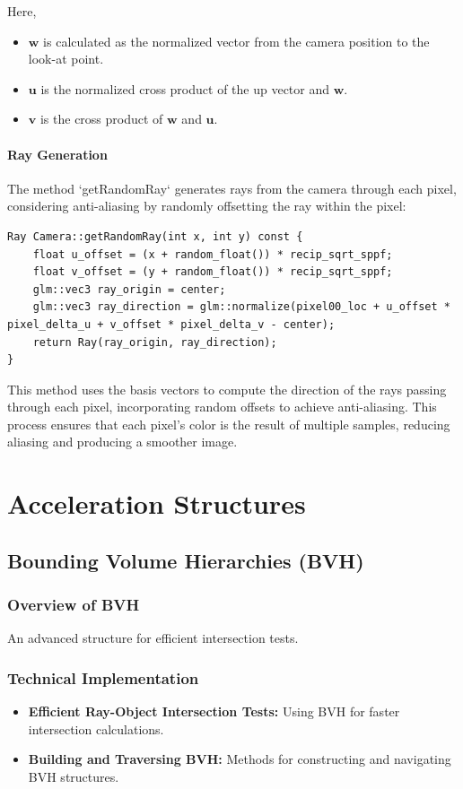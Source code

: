 \documentclass[12pt]{article}
\begin{document}
Here,
\begin{itemize}
    \item \(\mathbf{w}\) is calculated as the normalized vector from the camera position to the look-at point.
    \item \(\mathbf{u}\) is the normalized cross product of the up vector and \(\mathbf{w}\).
    \item \(\mathbf{v}\) is the cross product of \(\mathbf{w}\) and \(\mathbf{u}\).
\end{itemize}

\paragraph{Ray Generation}
The method `getRandomRay` generates rays from the camera through each pixel, considering anti-aliasing by randomly offsetting the ray within the pixel:

\begin{verbatim}
Ray Camera::getRandomRay(int x, int y) const {
    float u_offset = (x + random_float()) * recip_sqrt_sppf;
    float v_offset = (y + random_float()) * recip_sqrt_sppf;
    glm::vec3 ray_origin = center;
    glm::vec3 ray_direction = glm::normalize(pixel00_loc + u_offset * pixel_delta_u + v_offset * pixel_delta_v - center);
    return Ray(ray_origin, ray_direction);
}
\end{verbatim}

This method uses the basis vectors to compute the direction of the rays passing through each pixel, incorporating random offsets to achieve anti-aliasing. This process ensures that each pixel's color is the result of multiple samples, reducing aliasing and producing a smoother image.

\section{Acceleration Structures}
\label{sec:acceleration-structures}
\subsection{Bounding Volume Hierarchies (BVH)}
\subsubsection{Overview of BVH}
An advanced structure for efficient intersection tests.
\subsubsection{Technical Implementation}
\begin{itemize}
    \item \textbf{Efficient Ray-Object Intersection Tests:} Using BVH for faster intersection calculations.
    \item \textbf{Building and Traversing BVH:} Methods for constructing and navigating BVH structures.
\end{itemize}
\end{document}
